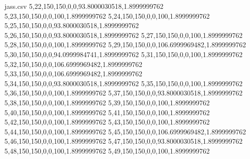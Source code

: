 \begin{filecontents*}{jass.csv}
5,22,150,150,0,0,93.8000030518,1.8999999762
5,23,150,150,0,0,100,1.8999999762
5,24,150,150,0,0,100,1.8999999762
5,25,150,150,0,0,93.8000030518,1.8999999762
5,26,150,150,0,0,93.8000030518,1.8999999762
5,27,150,150,0,0,100,1.8999999762
5,28,150,150,0,0,100,1.8999999762
5,29,150,150,0,0,106.6999969482,1.8999999762
5,30,150,150,0,0,94.0999984741,1.8999999762
5,31,150,150,0,0,100,1.8999999762
5,32,150,150,0,0,106.6999969482,1.8999999762
5,33,150,150,0,0,106.6999969482,1.8999999762
5,34,150,150,0,0,93.8000030518,1.8999999762
5,35,150,150,0,0,100,1.8999999762
5,36,150,150,0,0,100,1.8999999762
5,37,150,150,0,0,93.8000030518,1.8999999762
5,38,150,150,0,0,100,1.8999999762
5,39,150,150,0,0,100,1.8999999762
5,40,150,150,0,0,100,1.8999999762
5,41,150,150,0,0,100,1.8999999762
5,42,150,150,0,0,100,1.8999999762
5,43,150,150,0,0,100,1.8999999762
5,44,150,150,0,0,100,1.8999999762
5,45,150,150,0,0,106.6999969482,1.8999999762
5,46,150,150,0,0,100,1.8999999762
5,47,150,150,0,0,93.8000030518,1.8999999762
5,48,150,150,0,0,100,1.8999999762
5,49,150,150,0,0,100,1.8999999762
\end{filecontents*}

